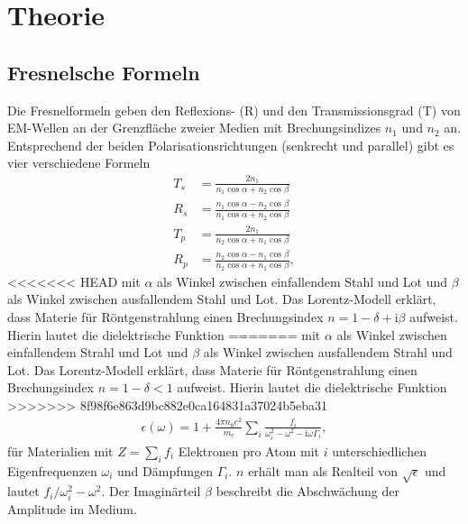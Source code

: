 

\section{Theorie}
\subsection{Fresnelsche Formeln}
Die Fresnelformeln geben den Reflexions- (R) und den Transmissionsgrad (T) von EM-Wellen an der Grenzfläche zweier Medien mit Brechungsindizes $n_1$ und $n_2$ an.
Entsprechend der beiden Polarisationsrichtungen (senkrecht und parallel) gibt es vier verschiedene Formeln
\begin{align}
 T_s &= \frac{2n_1}{n_1 \cos\alpha + n_2\cos\beta}\\
 R_s &= \frac{n_1 \cos\alpha - n_2\cos\beta}{n_1 \cos\alpha + n_2\cos\beta}\\
 T_p &= \frac{2n_1}{n_2 \cos\alpha + n_1\cos\beta}\\
 R_p &= \frac{n_2 \cos\alpha - n_1\cos\beta}{n_2 \cos\alpha + n_1\cos\beta},
\end{align}
<<<<<<< HEAD
\noindent mit $\alpha$ als Winkel zwischen einfallendem Stahl und Lot und $\beta$ als Winkel zwischen ausfallendem Stahl und Lot. Das Lorentz-Modell erklärt,
dass Materie für Röntgenstrahlung einen Brechungsindex $n = 1-\delta + \text{i}\beta$ aufweist. Hierin lautet die dielektrische Funktion
=======
\noindent mit $\alpha$ als Winkel zwischen einfallendem Strahl und Lot und $\beta$ als Winkel zwischen ausfallendem Strahl und Lot. Das Lorentz-Modell erklärt,
dass Materie für Röntgenstrahlung einen Brechungsindex $n = 1-\delta <1$ aufweist. Hierin lautet die dielektrische Funktion
>>>>>>> 8f98f6e863d9bc882e0ca164831a37024b5eba31
\begin{align}
 \epsilon(\omega) = 1 + \frac{4\pi n_0 e^2}{m_\text{e}} \sum\limits_i \frac{f_i}{\omega_i^2 - \omega^2 - \text{i}\omega\Gamma_i},
\end{align}
für Materialien mit $Z=\sum_i f_i$ Elektronen pro Atom mit $i$ unterschiedlichen Eigenfrequenzen $\omega_i$ und Dämpfungen $\Gamma_i$. $n$ erhält man als
Realteil von $\sqrt{\epsilon}$ und lautet $f_i / \omega_i^2 - \omega^2$. Der Imaginärteil $\beta$ beschreibt die Abschwächung der Amplitude im Medium.
